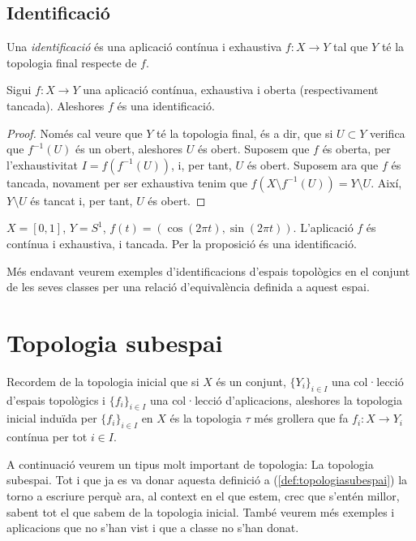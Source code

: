 \documentclass[../main.tex]{subfiles}
\begin{document}
\subsection{Identificació}

\begin{defi}
[Identificació]\label{def:identificacio}Una \textit{identificació} és una aplicació contínua i exhaustiva $f:X\rightarrow Y$ tal que $Y$ té la topologia final respecte de $f$.
\end{defi}

\begin{prop}
\label{prop:identificacio} Sigui $f:X\rightarrow Y$ una aplicació contínua, exhaustiva i oberta (respectivament tancada). Aleshores $f$ és una identificació.
\end{prop}
\begin{proof}
Només cal veure que $Y$ té la topologia final, és a dir, que si $U\subset Y$ verifica que $f^{-1}(U)$ és un obert, aleshores $U$ és obert. Suposem que $f$ és oberta, per l'exhaustivitat $I=f(f^{-1}(U))$, i, per tant, $U$ és obert. Suposem ara que $f$ és tancada, novament per ser exhaustiva tenim que $f(X\setminus f^{-1}(U)) = Y\setminus U$. Així, $Y\setminus U$ és tancat i, per tant, $U$ és obert.
\end{proof}
\begin{ej}
\label{ej:topologiafinal} $X = [0,1]$, $Y = S^1$, $f(t) = (\cos(2\pi t),\sin(2\pi t))$. L'aplicació $f$ és contínua i exhaustiva, i tancada. Per la proposició és una identificació.
\end{ej}

Més endavant veurem exemples d'identificacions d'espais topològics en el conjunt de les seves classes per una relació d'equivalència definida a aquest espai.



\section{Topologia subespai}
Recordem de la topologia inicial que si $X$ és un conjunt, $\{Y_i\}_{i\in I}$ una col·lecció d'espais topològics i $\{f_i\}_{i\in I}$ una col·lecció d'aplicacions, aleshores la topologia inicial induïda per $\{f_i\}_{i\in I}$ en $X$ és la topologia $\tau$ més grollera que fa $f_i:X\rightarrow Y_i$ contínua per tot $i\in I$.

A continuació veurem un tipus molt important de topologia: La topologia subespai. Tot i que ja es va donar aquesta definició a (\ref{def:topologiasubespai}) la torno a escriure perquè ara, al context en el que estem, crec que s'entén millor, sabent tot el que sabem de la topologia inicial. També veurem més exemples i aplicacions que no s'han vist i que a classe no s'han donat.
\end{document}
